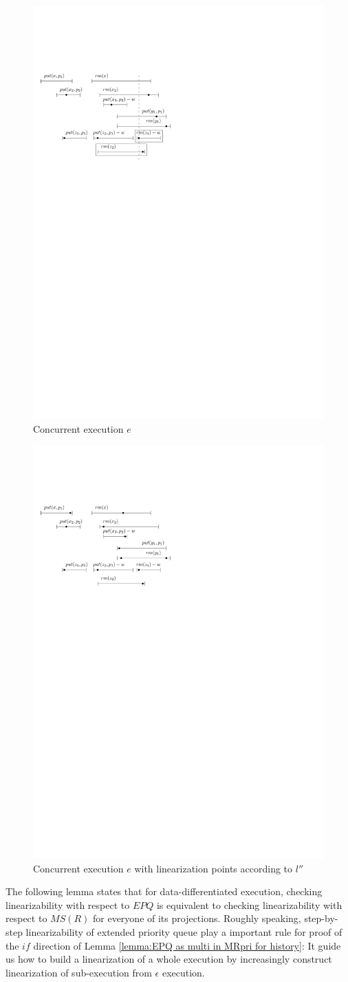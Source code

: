 \begin{figure}[htbp]
  \centering
  \includegraphics[width=0.5 \textwidth]{figures/PIC-HIS-EPQ1.pdf}
  \caption{Concurrent execution $e$}
  \label{fig:concurrent execution for EPQ1}
\end{figure}


\begin{figure}[htbp]
  \centering
  \includegraphics[width=0.5 \textwidth]{figures/PIC-HIS-EPQ1-NEWLP.pdf}
  \caption{Concurrent execution $e$ with linearization points according to $l''$}
  \label{fig:concurrent execution with new linearization points for EPQ1}
\end{figure}


The following lemma states that for data-differentiated execution, checking linearizability with respect to $\textit{EPQ}$ is equivalent to checking linearizability with respect to $\textit{MS}(R)$ for everyone of its projections. Roughly speaking, step-by-step linearizability of extended priority queue play a important rule for proof of the $\textit{if}$ direction of Lemma \ref{lemma:EPQ as multi in MRpri for history}: It guide us how to build a linearization of a whole execution by increasingly construct linearization of sub-execution from $\epsilon$ execution.

